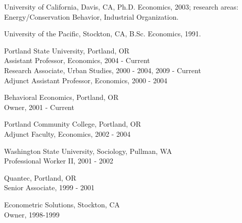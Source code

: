 \documentclass[Computer Science]{vita}
\begin{document}


  

\begin{vita}

  \begin{Degrees}
  \item University of California, Davis, CA, Ph.D. Economics, 2003;
    research areas: Energy/Conservation Behavior, Industrial
    Organization.

  \item University of the Pacific, Stockton, CA, B.Sc. Economics,
    1991.
  \end{Degrees}

  \begin{Experience}
	
  \item Portland State University,  Portland, OR\\
    Assistant Professor, Economics, 2004 - Current\\
    Research Associate, Urban Studies, 2000 - 2004, 2009 - Current\\
    Adjunct Assistant Professor, Economics, 2000 - 2004
	
  \item Behavioral Economics, Portland, OR\\
    Owner, 2001 - Current
		
  \item Portland Community College, Portland, OR\\
    Adjunct Faculty, Economics, 2002 - 2004
	
  \item Washington State University, Sociology, Pullman, WA\\
    Professional Worker II, 2001 - 2002
	
  \item Quantec, Portland, OR\\
    Senior Associate, 1999 - 2001
	
  \item Econometric Solutions, Stockton, CA\\
    Owner, 1998-1999
		

\end{Experience}
\end{vita}
\end{document}

